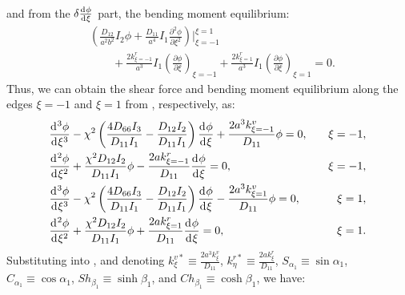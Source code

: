 \documentclass[preprint,12pt,number]{elsarticle}
\newcommand{\id}{\mathrm{d}\mkern1mu}
\begin{document}
%
and from the $\delta \frac{\id \phi}{\id \xi}$ part, the bending moment equilibrium:
%
\begin{equation}\label{eq:inertial_forcex2}
\begin{split}	
	&\left( \frac{D_{12}}{a^2b^2} I_2 \phi + \frac{D_{11}}{a^4} I_1 \frac{\partial^2 \phi}{\partial \xi^2} \right) 
	\Big|^{\xi=1}_{\xi=-1} \\
	&\qquad + \frac{2k^r_{\xi=-1}}{a^3} I_1 \left(\frac{\partial \phi}{\partial \xi}\right)_{\xi=-1}
	+ \frac{2k^r_{\xi=1}}{a^3} I_1 \left(\frac{\partial \phi}{\partial \xi}\right)_{\xi=1} = 0.
\end{split}
\end{equation}
%
Thus, we can obtain the shear force and bending moment equilibrium along the edges $\xi = -1$ and $\xi = 1$ from , respectively, as:
%
\begin{subequations}\label{eq:boundaryx}
\begin{align}
	&  \frac{\id^3 \phi}{\id \xi^3} - \chi^2\left( \frac{4D_{66}I_3}{D_{11}I_1}  - \frac{D_{12}I_2}{D_{11}I_1}  \right) \frac{\id \phi}{\id \xi} 
	+\frac{2a^3k^v_{\xi=-1}}{D_{11}}\phi = 0, \quad &\xi = -1, \\
	& \frac{\id^2 \phi}{\id \xi^2} + \frac{\chi^2 D_{12} I_2}{D_{11} I_1} \phi - \frac{2a k^r_{\xi=-1}}{D_{11}} \frac{\id \phi}{\id \xi} = 0, \quad &\xi = -1, \\
	& \frac{\id^3 \phi}{\id \xi^3} - \chi^2\left( \frac{4D_{66}I_3}{D_{11}I_1}  - \frac{D_{12}I_2}{D_{11}I_1}  \right) \frac{\id \phi}{\id \xi} 
	-\frac{2a^3 k^v_{\xi=1}}{D_{11}} \phi = 0, \quad &\xi = 1, \\
	& \frac{\id^2 \phi}{\id \xi^2} + \frac{\chi^2 D_{12} I_2}{D_{11} I_1} \phi + \frac{2a k^r_{\xi=1}}{D_{11}} \frac{\id \phi}{\id \xi} = 0, \quad &\xi = 1.
\end{align}
\end{subequations}
%
Substituting  into , and denoting 
$k^{v*}_{\xi} \equiv \frac{2a^3 k^v_{\xi}}{D_{11}} $, 
$ k^{r*}_{\eta} \equiv \frac{2a k^r_{\xi}}{D_{11}} $, 
$ S_{\alpha_1} \equiv \sin \alpha_1 $, 
$ C_{\alpha_1} \equiv \cos \alpha_1 $, 
$ Sh_{\beta_1} \equiv \sinh \beta_1$, 
and $ Ch_{\beta_1} \equiv \cosh \beta_1 $, we have:
%
\end{document}

